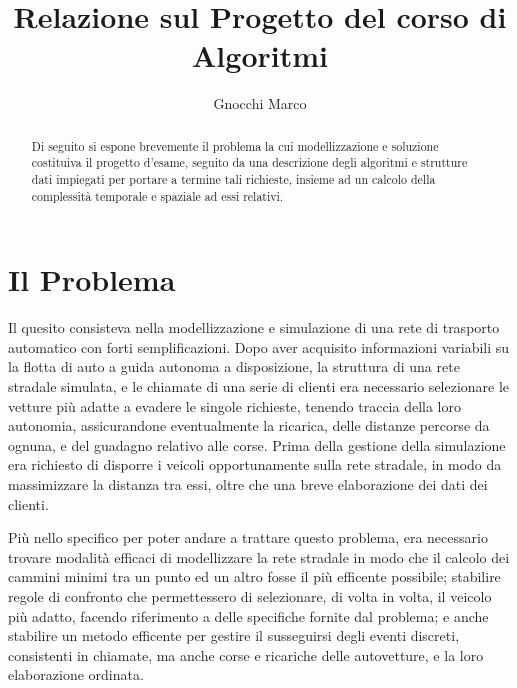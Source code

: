 \documentclass[a4paper,11pt]{Article}
\begin{document}
\makeatletter
{}
\makeatother

\newcommand{\R}[1]{$\mathbb{R}^#1$} %
\newtheorem{theorem}{Teorema}[section]
\newtheorem{defn}{Definizione}[section]

\author{Gnocchi Marco}
\title{Relazione sul Progetto del corso di Algoritmi}

\maketitle

\begin{abstract}
Di seguito si espone brevemente il problema la cui modellizzazione e soluzione costituiva il progetto d'esame, seguito da una descrizione degli algoritmi e strutture dati impiegati per portare a termine tali richieste, insieme ad un calcolo della complessità temporale e spaziale ad essi relativi.


\end{abstract}
\clearpage   %


\tableofcontents
\clearpage   %


\section{Il Problema}

Il quesito consisteva nella modellizzazione e simulazione di una rete di trasporto automatico con forti semplificazioni. Dopo aver acquisito informazioni variabili su la flotta di auto a guida autonoma a disposizione, la struttura di una rete stradale simulata, e le chiamate di una serie di clienti era necessario selezionare le vetture più adatte a evadere le singole richieste, tenendo traccia della loro autonomia, assicurandone eventualmente la ricarica, delle distanze percorse da ognuna, e del guadagno relativo alle corse.
Prima della gestione della simulazione era richiesto di disporre i veicoli opportunamente sulla rete stradale, in modo da massimizzare la distanza tra essi, oltre che una breve elaborazione dei dati dei clienti.

Più nello specifico per poter andare a trattare questo problema, era necessario trovare modalità efficaci di modellizzare la rete stradale in modo che il calcolo dei cammini minimi tra un punto ed un altro fosse il più efficente possibile; stabilire regole di confronto che permettessero di selezionare, di volta in volta, il veicolo più adatto, facendo riferimento a delle specifiche fornite dal problema; e anche stabilire un metodo efficente per gestire il susseguirsi degli eventi discreti, consistenti in chiamate, ma anche corse e ricariche delle autovetture, e la loro elaborazione ordinata.
\end{document}
